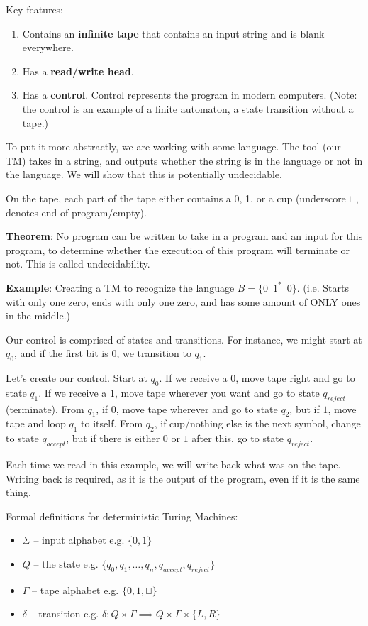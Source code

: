 \documentclass{article}
\begin{document}
Key features:
\begin{enumerate}
    \item Contains an \textbf{infinite tape} that contains an input string and is blank everywhere.
    \item Has a \textbf{read/write head}.
    \item Has a \textbf{control}. Control represents the program in modern computers. (Note: the control is an example of a finite automaton, a state transition without a tape.)
\end{enumerate}

To put it more abstractly, we are working with some language. The tool (our TM) takes in a string, and outputs whether the string is in the language or not in the language. We will show that this is potentially undecidable.

On the tape, each part of the tape either contains a 0, 1, or a cup (underscore $\sqcup$, denotes end of program/empty).

\textbf{Theorem}: No program can be written to take in a program and an input for this program, to determine whether the execution of this program will terminate or not. This is called undecidability.

\textbf{Example}: Creating a TM to recognize the language $B = \{0 \,\,\, 1^* \,\,\, 0\}$. (i.e. Starts with only one zero, ends with only one zero, and has some amount of ONLY ones in the middle.)

Our control is comprised of states and transitions. For instance, we might start at $q_0$, and if the first bit is $0$, we transition to $q_1$.

Let's create our control. Start at $q_0$. If we receive a $0$, move tape right and go to state $q_1$. If we receive a $1$, move tape wherever you want and go to state $q_{reject}$ (terminate). From $q_1$, if $0$, move tape wherever and go to state $q_2$, but if $1$, move tape and loop $q_1$ to itself. From $q_2$, if cup/nothing else is the next symbol, change to state $q_{accept}$, but if there is either $0$ or $1$ after this, go to state $q_{reject}$.

Each time we read in this example, we will write back what was on the tape. Writing back is required, as it is the output of the program, even if it is the same thing.

Formal definitions for deterministic Turing Machines:
\begin{itemize}
    \item $\Sigma$ -- input alphabet e.g. $\{0, 1\}$
    \item $Q$ -- the state e.g. $\{q_0, q_1, \dots, q_n, q_{accept}, q_{reject}\}$
    \item $\Gamma$ -- tape alphabet e.g. $\{0, 1, \sqcup\}$
    \item $\delta$ -- transition e.g. $\delta: Q \times \Gamma \implies Q \times \Gamma \times \{L, R\}$
\end{itemize}
\end{document}
